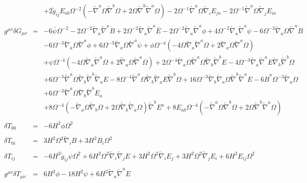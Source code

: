 \documentclass[10pt,letterpaper]{article}
\numberwithin{equation}{section}
\begin{document}
\begin{eqnarray}
&& + 2 \tilde{g}_{ij} E_{ab} \Omega^{-2} (- \tilde{\nabla}^{a}\Omega \tilde{\nabla}^{b}\Omega + 2 \Omega \tilde{\nabla}^{b}\tilde{\nabla}^{a}\Omega) - 2 \Omega^{-1} \tilde{\nabla}^{a}\Omega \tilde{\nabla}_{i}E_{ja} - 2 \Omega^{-1} \tilde{\nabla}^{a}\Omega \tilde{\nabla}_{j}E_{ia}
\\  \nonumber\\ 
g^{\mu\nu}\delta G_{\mu\nu}&=& -6 \overset{..}{\psi} \Omega^{-2} - 2 \Omega^{-2} \tilde{\nabla}_{a}\tilde{\nabla}^{a}\dot{B} + 2 \Omega^{-2} \tilde{\nabla}_{a}\tilde{\nabla}^{a}\overset{..}{E} - 2 \Omega^{-2} \tilde{\nabla}_{a}\tilde{\nabla}^{a}\phi + 4 \Omega^{-2} \tilde{\nabla}_{a}\tilde{\nabla}^{a}\psi - 6 \Omega^{-3} \tilde{\nabla}_{a}\Omega \tilde{\nabla}^{a}\dot{B} \nonumber \\ 
&& - 6 \Omega^{-3} \tilde{\nabla}_{a}\Omega \tilde{\nabla}^{a}\phi + 6 \Omega^{-3} \tilde{\nabla}_{a}\Omega \tilde{\nabla}^{a}\psi + \phi \Omega^{-4} (-4 \Omega \tilde{\nabla}_{a}\tilde{\nabla}^{a}\Omega + 2 \tilde{\nabla}_{a}\Omega \tilde{\nabla}^{a}\Omega) \nonumber \\ 
&& + \psi \Omega^{-4} (-4 \Omega \tilde{\nabla}_{a}\tilde{\nabla}^{a}\Omega + 2 \tilde{\nabla}_{a}\Omega \tilde{\nabla}^{a}\Omega) + 2 \Omega^{-4} \tilde{\nabla}_{a}\Omega \tilde{\nabla}^{a}\Omega \tilde{\nabla}_{b}\tilde{\nabla}^{b}E - 4 \Omega^{-3} \tilde{\nabla}_{a}\tilde{\nabla}^{a}E \tilde{\nabla}_{b}\tilde{\nabla}^{b}\Omega \nonumber \\ 
&& + 6 \Omega^{-3} \tilde{\nabla}^{a}\Omega \tilde{\nabla}_{b}\tilde{\nabla}^{b}\tilde{\nabla}_{a}E - 8 \Omega^{-4} \tilde{\nabla}^{a}\Omega \tilde{\nabla}_{b}\tilde{\nabla}_{a}E \tilde{\nabla}^{b}\Omega + 16 \Omega^{-3} \tilde{\nabla}_{b}\tilde{\nabla}_{a}\Omega \tilde{\nabla}^{b}\tilde{\nabla}^{a}E-6 \dot{B}^{a} \Omega^{-3} \tilde{\nabla}_{a}\Omega \nonumber \\ 
&& + 6 \Omega^{-3} \tilde{\nabla}^{a}\Omega \tilde{\nabla}_{b}\tilde{\nabla}^{b}E_{a} \nonumber \\ 
&& + 8 \Omega^{-4} (- \tilde{\nabla}_{a}\Omega \tilde{\nabla}_{b}\Omega + 2 \Omega \tilde{\nabla}_{b}\tilde{\nabla}_{a}\Omega) \tilde{\nabla}^{b}E^{a}+8 E_{ab} \Omega^{-4} (- \tilde{\nabla}^{a}\Omega \tilde{\nabla}^{b}\Omega + 2 \Omega \tilde{\nabla}^{b}\tilde{\nabla}^{a}\Omega)
\\ \nonumber\\
\delta T_{00}&=& -6 H^2 \phi \Omega^2
\\  \nonumber\\ 
\delta T_{0i}&=& 3 H^2 \Omega^2 \tilde{\nabla}_{i}B+3 H^2 B_{i} \Omega^2
\\  \nonumber\\ 
\delta T_{ij}&=& -6 H^2 \tilde{g}_{ij} \psi \Omega^2 + 6 H^2 \Omega^2 \tilde{\nabla}_{i}\tilde{\nabla}_{j}E+3 H^2 \Omega^2 \tilde{\nabla}_{i}E_{j} + 3 H^2 \Omega^2 \tilde{\nabla}_{j}E_{i}+6 H^2 E_{ij} \Omega^2
\\  \nonumber\\ 
g^{\mu\nu}\delta T_{\mu\nu}&=& 6 H^2 \phi - 18 H^2 \psi + 6 H^2 \tilde{\nabla}_{a}\tilde{\nabla}^{a}E
\end{eqnarray}
%
%
%
%
\end{document}
